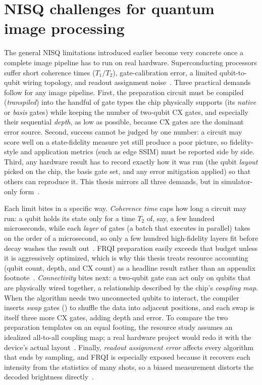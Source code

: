 \section{NISQ challenges for quantum image processing}
The general NISQ limitations introduced earlier become very concrete once a complete image pipeline has to run on real hardware. Superconducting processors suffer short coherence times ($T_1/T_2$), gate-calibration error, a limited qubit-to-qubit wiring topology, and readout assignment noise~\cite{Geng2023ImprovedFRQI}. Three practical demands follow for any image pipeline. First, the preparation circuit must be compiled (\emph{transpiled}) into the handful of gate types the chip physically supports (its \emph{native} or \emph{basis} gates) while keeping the number of two-qubit CX gates, and especially their sequential \emph{depth}, as low as possible, because CX gates are the dominant error source. Second, success cannot be judged by one number: a circuit may score well on a state-fidelity measure yet still produce a poor picture, so fidelity-style and application metrics (such as edge SSIM) must be reported side by side. Third, any hardware result has to record exactly how it was run (the qubit \emph{layout} picked on the chip, the basis gate set, and any error mitigation applied) so that others can reproduce it. This thesis mirrors all three demands, but in simulator-only form~\cite{Geng2022HybridNISQEdge}.

Each limit bites in a specific way. \emph{Coherence time} caps how long a circuit may run: a qubit holds its state only for a time $T_2$ of, say, a few hundred microseconds, while each \emph{layer} of gates (a batch that executes in parallel) takes on the order of a microsecond, so only a few hundred high-fidelity layers fit before decay washes the result out~\cite{Preskill2018NISQ}. FRQI preparation easily exceeds that budget unless it is aggressively optimized, which is why this thesis treats resource accounting (qubit count, depth, and CX count) as a headline result rather than an appendix footnote~\cite{Geng2023ImprovedFRQI}. \emph{Connectivity} bites next: a two-qubit gate can act only on qubits that are physically wired together, a relationship described by the chip's \emph{coupling map}. When the algorithm needs two unconnected qubits to interact, the compiler inserts \emph{swap} gates () to shuffle the data into adjacent positions, and each swap is itself three more CX gates, adding depth and error. To compare the two preparation templates on an equal footing, the resource study assumes an idealized all-to-all coupling map; a real hardware project would redo it with the device's actual layout~\cite{Geng2022HybridNISQEdge}. Finally, \emph{readout assignment error} affects every algorithm that ends by sampling, and FRQI is especially exposed because it recovers each intensity from the statistics of many shots, so a biased measurement distorts the decoded brightness directly~\cite{Mu2025GuidedImageFiltering}.

